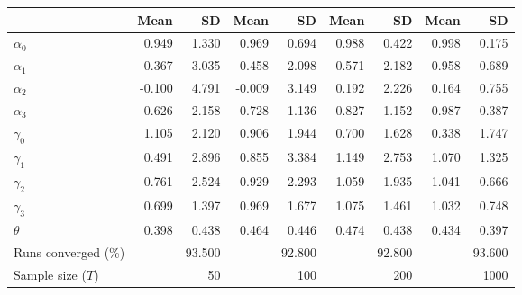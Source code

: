 
\begin{tabular}[t]{lrrrrrrrr}
\toprule
  & Mean & SD & Mean  & SD  & Mean   & SD   & Mean    & SD   \\
\midrule
$\alpha_{0}$ & 0.949 & 1.330 & 0.969 & 0.694 & 0.988 & 0.422 & 0.998 & 0.175\\
$\alpha_{1}$ & 0.367 & 3.035 & 0.458 & 2.098 & 0.571 & 2.182 & 0.958 & 0.689\\
$\alpha_{2}$ & -0.100 & 4.791 & -0.009 & 3.149 & 0.192 & 2.226 & 0.164 & 0.755\\
$\alpha_{3}$ & 0.626 & 2.158 & 0.728 & 1.136 & 0.827 & 1.152 & 0.987 & 0.387\\
$\gamma_{0}$ & 1.105 & 2.120 & 0.906 & 1.944 & 0.700 & 1.628 & 0.338 & 1.747\\
$\gamma_{1}$ & 0.491 & 2.896 & 0.855 & 3.384 & 1.149 & 2.753 & 1.070 & 1.325\\
$\gamma_{2}$ & 0.761 & 2.524 & 0.929 & 2.293 & 1.059 & 1.935 & 1.041 & 0.666\\
$\gamma_{3}$ & 0.699 & 1.397 & 0.969 & 1.677 & 1.075 & 1.461 & 1.032 & 0.748\\
$\theta$ & 0.398 & 0.438 & 0.464 & 0.446 & 0.474 & 0.438 & 0.434 & 0.397\\
Runs converged (\%) &  & 93.500 &  & 92.800 &  & 92.800 &  & 93.600\\
Sample size ($T$) &  & 50 &  & 100 &  & 200 &  & 1000\\
\bottomrule
\end{tabular}
